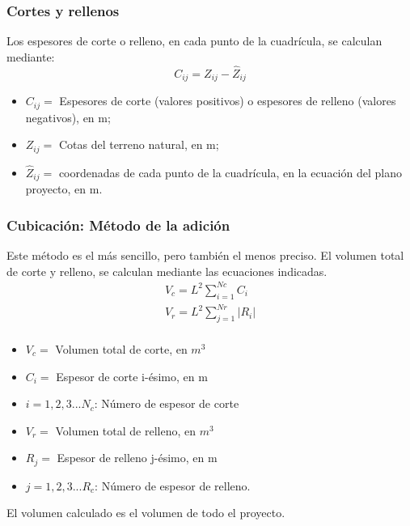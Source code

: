 \subsubsection{Cortes y rellenos}
Los espesores de corte o relleno, en cada
punto de la cuadrícula, se calculan mediante:
\begin{equation}
  C_{ij} = Z_{ij} - \hat{Z}_{ij}
\end{equation}
\begin{notation}
  \begin{itemize}
    \item $C_{ij}=$ Espesores de corte (valores positivos) o espesores de relleno (valores negativos), en m;    
    \item $Z_{ij}=$ Cotas del terreno natural, en m;
    \item $\hat{Z}_{ij}=$ coordenadas de cada punto de la cuadrícula, en la ecuación del plano proyecto, en m.    
  \end{itemize}
\end{notation}
\subsubsection{Cubicación: Método de la adición}
Este método es el más sencillo, pero también el menos preciso. El volumen total de corte y relleno, se calculan mediante las ecuaciones indicadas. 
\begin{align*}
  V_c = L^2 \sum_{i = 1}^{Nc} C_i\\
  V_r = L^2 \sum_{j = 1}^{Nr} \left\lvert R_i \right\rvert \\
\end{align*}
\begin{notation}
  \begin{itemize}
    \item $V_c=$ Volumen total de corte, en $m^3$
    \item $C_i=$ Espesor de corte i-ésimo, en m
    \item $i= 1,2,3...N_c$: Número de espesor de corte
    \item $V_r=$ Volumen total de relleno, en $m^3$
    \item $R_j=$ Espesor de relleno j-ésimo, en m
    \item $j=1,2,3...R_c$: Número de espesor de relleno.
  \end{itemize}
\end{notation}
El volumen calculado es el volumen de todo el proyecto.
